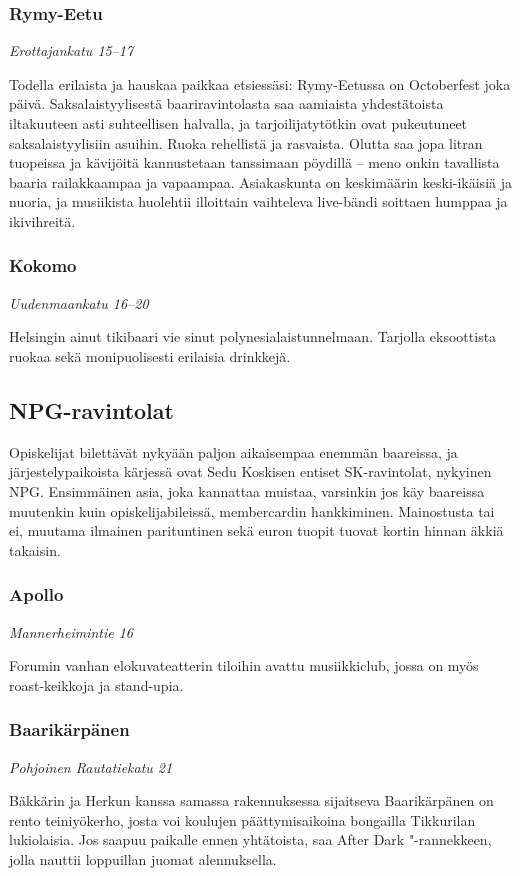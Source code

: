 \documentclass[../ala_hataile.tex]{subfiles}
\begin{document}
\subsubsection*{Rymy-Eetu}
\textit{Erottajankatu 15--17}

Todella erilaista ja hauskaa paikkaa etsiessäsi:
Rymy-Eetussa on Octoberfest joka
päivä. Saksalaistyylisestä baariravintolasta
saa aamiaista yhdestätoista iltakuuteen asti
suhteellisen halvalla, ja tarjoilijatytötkin
ovat pukeutuneet saksalaistyylisiin asuihin.
Ruoka rehellistä ja rasvaista. Olutta
saa jopa litran tuopeissa ja kävijöitä kannustetaan
tanssimaan pöydillä -- meno
onkin tavallista baaria railakkaampaa ja
vapaampaa. Asiakaskunta on keskimäärin
keski-ikäisiä ja nuoria, ja musiikista huolehtii
illoittain vaihteleva live-bändi soittaen
humppaa ja ikivihreitä.
\subsubsection*{Kokomo}
\textit{Uudenmaankatu 16--20}

Helsingin ainut tikibaari vie sinut polynesialaistunnelmaan.
Tarjolla eksoottista
ruokaa sekä monipuolisesti erilaisia drinkkejä.
\subsection*{NPG-ravintolat}
Opiskelijat bilettävät nykyään paljon
aikaisempaa enemmän baareissa, ja järjestelypaikoista
kärjessä ovat Sedu Koskisen
entiset SK-ravintolat, nykyinen NPG. Ensimmäinen
asia, joka kannattaa muistaa,
varsinkin jos käy baareissa muutenkin kuin
opiskelijabileissä, membercardin hankkiminen.
Mainostusta tai ei, muutama ilmainen
parituntinen sekä euron tuopit tuovat
kortin hinnan äkkiä takaisin.
\subsubsection*{Apollo}
\textit{Mannerheimintie 16}

Forumin vanhan elokuvateatterin tiloihin avattu musiikkiclub, jossa on myös roast-keikkoja ja stand-upia.
\subsubsection*{Baarikärpänen}
\textit{Pohjoinen Rautatiekatu 21}

Bäkkärin ja Herkun kanssa samassa rakennuksessa sijaitseva Baarikärpänen on rento teiniyökerho, josta voi koulujen päättymisaikoina bongailla Tikkurilan lukiolaisia. Jos saapuu paikalle ennen yhtätoista, saa After Dark "-rannekkeen, jolla nauttii loppuillan juomat alennuksella.
\end{document}
